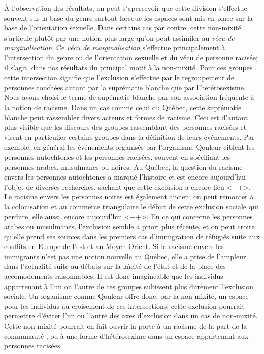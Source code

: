 À l'observation des résultats, on peut s'apercevoir que cette division s'effectue souvent sur la base du genre surtout lorsque les espaces sont mis en place sur la base de l'orientation sexuelle.
Dans certains cas par contre, cette non-mixité s'articule plutôt par une notion plus large qu'on peut assimiler au \emph{vécu de marginalisation}.
Ce \emph{vécu de marginalisation} s'effectue principalement à l'intersection du genre ou de l'orientation sexuelle et du vécu de personne racisée; il s'agit, dans nos résultats du principal motif à la non-mixité.
Pour ces groupes \lgbt{}, cette intersection signifie que l'exclusion s'effectue par le regroupement de personnes touchées autant par la suprématie blanche que par l'hétérosexisme.
Nous avons choisi le terme de supématie blanche par son association fréquente à la notion de racisme.
Dans un cas comme celui du Québec, cette suprématie blanche peut rassembler divers acteurs et formes de racisme.
Ceci est d'autant plus visible que les discours des groupes rassemblant des personnes racisées et \lgbt{} visent en particulier certains groupes dans la définition de leurs événements.
Par exemple, en général les événements organisés par l'organisme Qouleur ciblent les personnes autochtones et les personnes racisées, souvent en spécifiant les personnes arabes, musulmanes ou noires.
Au Québec, la question du racisme envers les personnes autochtones a marqué l'histoire et est encore aujourd'hui l'objet de diverses recherches, sachant que cette exclusion a encore lieu \missref{}<++>.
Le racisme envers les personnes noires est également ancien; on peut remonter à la colonisation et au commerce triangulaire le début de cette exclusion sociale qui perdure, elle aussi, encore aujourd'hui \missref{}<++>.
En ce qui concerne les personnes arabes ou musulmanes, l'exclusion semble a priori plus récente, et on peut croire qu'elle prend ses sources dans les premiers cas d'immigration de réfugiés suite aux conflits en Europe de l'est et au Moyen-Orient.
Si le racisme envers les immigrants n'est pas une notion nouvelle au Québec, elle a prise de l'ampleur dans l'actualité suite au débats sur la laïcité de l'état et de la place des accomodements raisonnables.
Il est donc imagineable que les individus \lgbt{} appartenant à l'un ou l'autre de ces groupes subissent plus durement l'exclusion sociale.
Un organisme comme Qouleur offre donc, par la non-mixité, un espace pour les individus au croisement de ces intersections;  cette exclusion pourrait permettre d'éviter l'un ou l'autre des axes d'exclusion dans un cas de non-mixité.
Cette non-mixité pourrait en fait ouvrir la porte à un racisme de la part de la communauté \lgbt{}, ou à une forme d'hétérosexime dans un espace appartenant aux personnes racisées.


